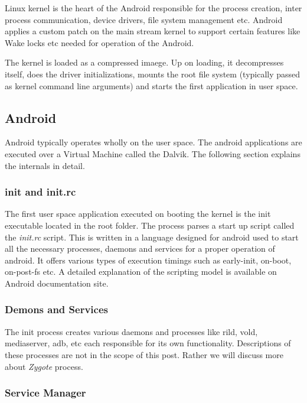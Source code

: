 Linux kernel is the heart of the Android responsible for the process creation, inter process communication, device drivers, file system management etc. Android applies a custom patch on the main stream kernel to support certain features like Wake locks etc needed for operation of the Android.

The kernel is loaded as a compressed imaege. Up on loading, it decompresses itself,
does the driver initializations, mounts the root file system (typically passed 
as kernel command line arguments) and starts the first application in user space.


\subsection{Android}

Android typically operates wholly on the user space. The android applications are executed over a Virtual Machine called the Dalvik. The following section explains the internals in detail.

\subsubsection{init and init.rc}

The first user space application executed on booting the kernel is the init
executable located in the root folder. The process parses a start up script
called the \textit{init.rc} script. This is written in a language designed
for android used to start all the necessary processes, daemons and services
for a proper operation of android. It offers various types of execution timings
such as early-init, on-boot, on-post-fs etc. A detailed explanation of the
scripting model is available on Android documentation site.

\subsubsection{Demons and Services}

The init process creates various daemons and processes like rild, vold,
mediaserver, adb, etc each responsible for its own functionality.
Descriptions of these processes are not in the scope of this post.
Rather we will discuss more about \textit{Zygote} process.

\subsubsection{Service Manager}

